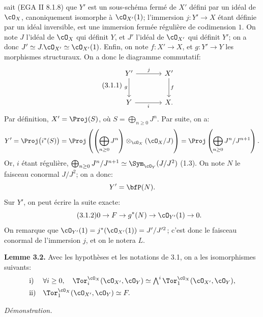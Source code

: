 sait (EGA II 8.1.8) que \(Y'\) est un sous-schéma fermé de \(X'\) défini par un idéal de \(\cO_X\), canoniquement isomorphe à \(\cO_{X'}(1)\); l'immersion \(j:Y'\to X\) étant définie par un idéal inversible, est une immersion fermée régulière de codimension \(1\). On note \(J\) l'idéal de \(\cO_X\) qui définit \(Y\), et \(J'\) l'idéal de \(\cO_{X'}\) qui définit \(Y'\); on a donc \(J'\simeq J.\cO_{X'}\simeq\cO_{X'}(1)\). Enfin, on note \(f:X'\to X\), et \(g:Y'\to Y\) les morphismes structuraux. On a donc le diagramme commutatif:
\begin{equation}\tag{3.1.1}
\begin{tikzcd}[column sep=large,row sep=large]
Y' \arrow[r,"j"] \arrow[d,"g"'] & X' \arrow[d,"f"]\\
Y \arrow[r,"i"'] & X.
\end{tikzcd}
\end{equation}
Par définition, \(X'=\Proj(S)\), où \(S=\bigoplus_{n\ge0}J^n\). Par suite, on a:
\[
Y'=\Proj\bigl(i^*(S)\bigr)
=\Proj\left(\left(\bigoplus_{n\ge0}J^n\right)\otimes_{\cO_X}(\cO_X/J)\right)
=\Proj\left(\bigoplus_{n\ge0}J^n/J^{n+1}\right).
\]
Or, \(i\) étant régulière, \(\bigoplus_{n\ge0}J^n/J^{n+1}\simeq \Sym_{\cO_Y}(J/J^2)\) (1.3). On note \(N\) le faisceau conormal \(J/J^2\); on a donc:
\[
Y'=\bfP(N).
\]
Sur \(Y'\), on peut écrire la suite exacte:
\begin{equation}\tag{3.1.2}
0\to F\to g^*(N)\to\cO_{Y'}(1)\to0.
\end{equation}
On remarque que \(\cO_{Y'}(1)=j^*(\cO_{X'}(1))=J'/J'^2\); c'est donc le faisceau conormal de l'immersion \(j\), et on le notera \(L\).

\textbf{Lemme 3.2.} Avec les hypothèses et les notations de 3.1, on a les isomorphismes suivants:
\[
\begin{array}{ll}
\text{i)}&
\forall i\ge0,\quad
\Tor_i^{\cO_X}(\cO_{X'},\cO_Y)
\simeq
\bigwedge^i\Tor_1^{\cO_X}(\cO_{X'},\cO_Y),\\[4pt]
\text{ii)}&
\Tor_1^{\cO_X}(\cO_{X'},\cO_Y)\simeq F.
\end{array}
\]

\textit{Démonstration.}
